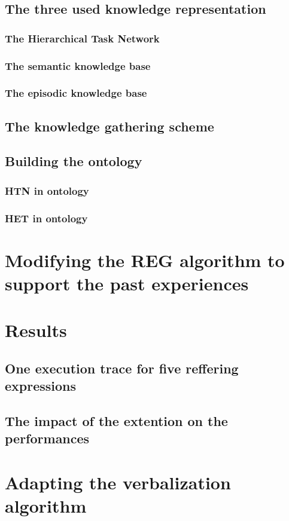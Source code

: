 \subsection{The three used knowledge representation}

\subsubsection{The Hierarchical Task Network}

\subsubsection{The semantic knowledge base}

\subsubsection{The episodic knowledge base}

\subsection{The knowledge gathering scheme}

\subsection{Building the ontology}

\subsubsection{HTN in ontology}

\subsubsection{HET in ontology}

\section{Modifying the REG algorithm to support the past experiences}

\section{Results}

\subsection{One execution trace for five reffering expressions}

\subsection{The impact of the extention on the performances}

\section{Adapting the verbalization algorithm}